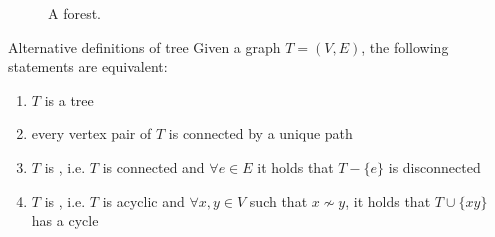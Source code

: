 \documentclass[a4paper, 12pt]{report}
\begin{document}
    \begin{figure}[H]
        \centering
        \caption{A forest.}
    \end{figure}

    \begin{framedthm}[label={tree alt}]{Alternative definitions of tree}
        Given a graph $T = (V, E)$, the following statements are equivalent:

        \begin{enumerate}
            \item $T$ is a tree
            \item every vertex pair of $T$ is connected by a unique path
            \item $T$ is , i.e. $T$ is connected and $\forall e \in E$ it holds that $T- \{e\}$ is disconnected
            \item $T$ is , i.e. $T$ is acyclic and $\forall x, y \in V$ such that $x \nsim y$, it holds that $T \cup \{xy\}$ has a cycle
        \end{enumerate}
    \end{framedthm}
\end{document}
